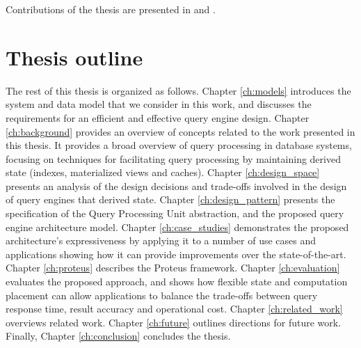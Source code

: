 Contributions of the thesis are presented in \cite{10.1145/3194261.3194265} and \cite{app:rep:sh222}.


\section{Thesis outline}

The rest of this thesis is organized as follows.
Chapter \ref{ch:models} introduces the system and data model that we consider in this work,
and discusses the requirements for an efficient and effective query engine design.
Chapter \ref{ch:background} provides an overview of concepts related to the work presented in this thesis.
It provides a broad overview of query processing in database systems,
focusing on techniques for facilitating query processing by maintaining derived state (indexes, materialized views and caches).
Chapter \ref{ch:design_space} presents an analysis of the design decisions and trade-offs involved in the design
of query engines that derived state.
Chapter \ref{ch:design_pattern} presents the specification of the Query Processing Unit abstraction,
and the proposed query engine architecture model.
Chapter \ref{ch:case_studies} demonstrates the proposed architecture's expressiveness by applying it to a number
of use cases and applications showing how it can provide improvements over the state-of-the-art.
Chapter \ref{ch:proteus} describes the Proteus framework.
Chapter \ref{ch:evaluation} evaluates the proposed approach,
and shows how flexible state and computation placement can allow applications to balance the trade-offs between
query response time, result accuracy and operational cost.
Chapter \ref{ch:related_work} overviews related work.
Chapter \ref{ch:future} outlines directions for future work.
Finally, Chapter \ref{ch:conclusion} concludes the thesis.

